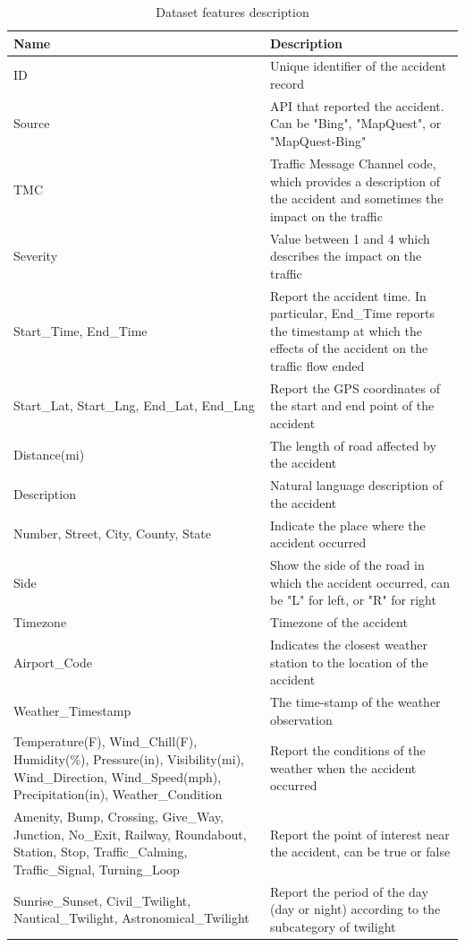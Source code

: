\documentclass{article}
\begin{document}
\begin{table}[h!]
\begin{tabularx}{\textwidth}{|X|X|}
\hline
\textbf{Name} & \textbf{Description} \\
\hline
ID & Unique identifier of the accident record \\
\hline
Source & API that reported the accident. Can be "Bing", "MapQuest", or "MapQuest-Bing" \\
\hline
TMC & Traffic Message Channel code, which provides a description of the accident and sometimes the impact on the traffic \\
\hline
Severity & Value between 1 and 4 which describes the impact on the traffic \\
\hline
Start\_Time, End\_Time & Report the accident time. In particular, End\_Time reports the timestamp at which the effects of the accident on the traffic flow ended \\
\hline
Start\_Lat, Start\_Lng, End\_Lat, End\_Lng & Report the GPS coordinates of the start and end point of the accident \\
\hline
Distance(mi) & The length of road affected by the accident \\
\hline
Description & Natural language description of the accident \\
\hline
Number, Street, City, County, State & Indicate the place where the accident occurred \\
\hline
Side & Show the side of the road in which the accident occurred, can be "L" for left, or "R" for right \\
\hline
Timezone & Timezone of the accident \\
\hline
Airport\_Code & Indicates the closest weather station to the location of the accident \\
\hline
Weather\_Timestamp & The time-stamp of the weather observation \\
\hline
Temperature(F), Wind\_Chill(F), Humidity(\%), Pressure(in), Visibility(mi), Wind\_Direction, Wind\_Speed(mph), Precipitation(in), Weather\_Condition & Report the conditions of the weather when the accident occurred \\
\hline
Amenity, Bump, Crossing, Give\_Way, Junction, No\_Exit, Railway, Roundabout, Station, Stop, Traffic\_Calming, Traffic\_Signal, Turning\_Loop & Report the point of interest near the accident, can be true or false \\
\hline
Sunrise\_Sunset, Civil\_Twilight, Nautical\_Twilight, Astronomical\_Twilight & Report the period of the day (day or night) according to the subcategory of twilight \\
\hline
\end{tabularx}
\caption{Dataset features description}
\label{tab:features}
\end{table}
\end{document}
